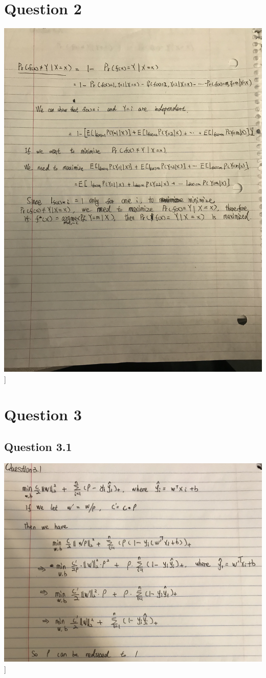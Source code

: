 \documentclass[11pt]{article} %
\begin{document}
\section{Question 2}
\includegraphics[scale=0.15]{q2.jpeg}]


\section{Question 3}
\subsection{Question 3.1}
\includegraphics[scale=0.15]{q31.jpeg}]
\end{document}
